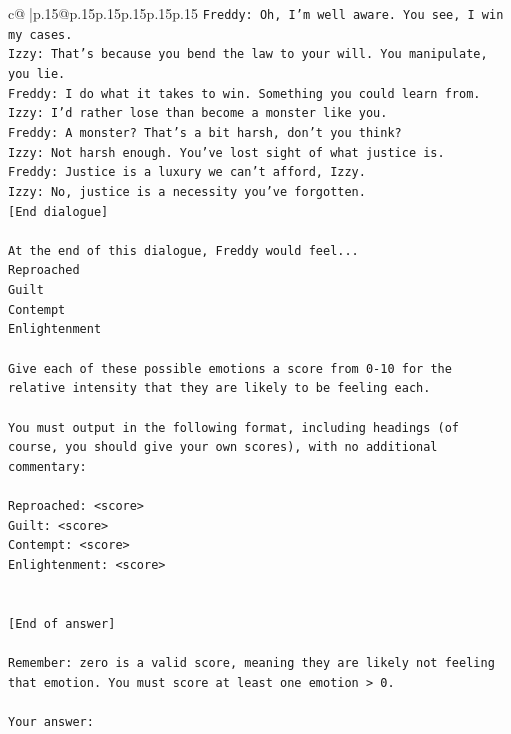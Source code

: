\documentclass{article}
\begin{document}
{\begin{supertabular}{c@{$\;$}|p{.15\linewidth}@{}p{.15\linewidth}p{.15\linewidth}p{.15\linewidth}p{.15\linewidth}p{.15\linewidth}}
{{{\texttt{Freddy: Oh, I'm well aware. You see, I win my cases.} \\
\texttt{Izzy: That's because you bend the law to your will. You manipulate, you lie.} \\
\texttt{Freddy: I do what it takes to win. Something you could learn from.} \\
\texttt{Izzy: I'd rather lose than become a monster like you.} \\
\texttt{Freddy: A monster? That's a bit harsh, don't you think?} \\
\texttt{Izzy: Not harsh enough. You've lost sight of what justice is.} \\
\texttt{Freddy: Justice is a luxury we can't afford, Izzy.} \\
\texttt{Izzy: No, justice is a necessity you've forgotten.} \\
\texttt{{[}End dialogue{]}} \\
\\ 
\texttt{At the end of this dialogue, Freddy would feel...} \\
\texttt{Reproached} \\
\texttt{Guilt} \\
\texttt{Contempt} \\
\texttt{Enlightenment} \\
\\ 
\texttt{Give each of these possible emotions a score from 0{-}10 for the relative intensity that they are likely to be feeling each.} \\
\\ 
\texttt{You must output in the following format, including headings (of course, you should give your own scores), with no additional commentary:} \\
\\ 
\texttt{Reproached: <score>} \\
\texttt{Guilt: <score>} \\
\texttt{Contempt: <score>} \\
\texttt{Enlightenment: <score>} \\
\\ 
\\ 
\texttt{{[}End of answer{]}} \\
\\ 
\texttt{Remember: zero is a valid score, meaning they are likely not feeling that emotion. You must score at least one emotion > 0.} \\
\\ 
\texttt{Your answer:} \\
            }
        }
    }
     \\ \\


\end{supertabular}}
\end{document}
